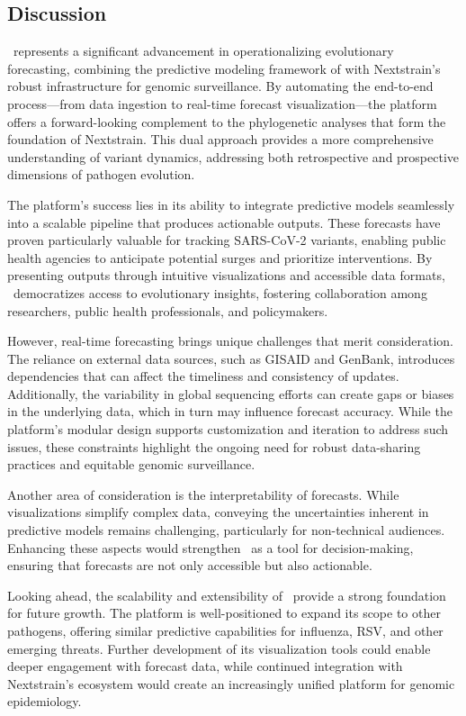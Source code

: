 \subsection{Discussion}

\forecastsNcov\ represents a significant advancement in operationalizing evolutionary forecasting, combining the predictive modeling framework of \evofr with Nextstrain’s robust infrastructure for genomic surveillance.
By automating the end-to-end process—from data ingestion to real-time forecast visualization—the platform offers a forward-looking complement to the phylogenetic analyses that form the foundation of Nextstrain.
This dual approach provides a more comprehensive understanding of variant dynamics, addressing both retrospective and prospective dimensions of pathogen evolution.

The platform’s success lies in its ability to integrate predictive models seamlessly into a scalable pipeline that produces actionable outputs.
These forecasts have proven particularly valuable for tracking SARS-CoV-2 variants, enabling public health agencies to anticipate potential surges and prioritize interventions.
By presenting outputs through intuitive visualizations and accessible data formats, \forecastsNcov\ democratizes access to evolutionary insights, fostering collaboration among researchers, public health professionals, and policymakers.

However, real-time forecasting brings unique challenges that merit consideration.
The reliance on external data sources, such as GISAID and GenBank, introduces dependencies that can affect the timeliness and consistency of updates.
Additionally, the variability in global sequencing efforts can create gaps or biases in the underlying data, which in turn may influence forecast accuracy.
While the platform’s modular design supports customization and iteration to address such issues, these constraints highlight the ongoing need for robust data-sharing practices and equitable genomic surveillance.

Another area of consideration is the interpretability of forecasts.
While visualizations simplify complex data, conveying the uncertainties inherent in predictive models remains challenging, particularly for non-technical audiences.
Enhancing these aspects would strengthen \forecastsNcov\ as a tool for decision-making, ensuring that forecasts are not only accessible but also actionable.

Looking ahead, the scalability and extensibility of \forecastsNcov\ provide a strong foundation for future growth.
The platform is well-positioned to expand its scope to other pathogens, offering similar predictive capabilities for influenza, RSV, and other emerging threats.
Further development of its visualization tools could enable deeper engagement with forecast data, while continued integration with Nextstrain’s ecosystem would create an increasingly unified platform for genomic epidemiology.

